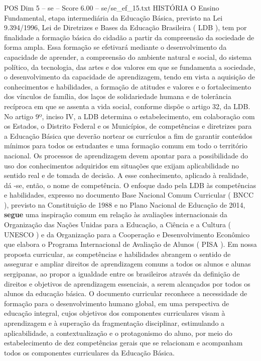 \begin{textsample}{POS Dim 5 – se – Score 6.00 – se/se\_ef\_15.txt}  \label{ex:f5_pos_137}
HISTÓRIA O Ensino Fundamental, etapa intermediária da Educação Básica, previsto na Lei 9.394/1996, Lei de Diretrizes e Bases da Educação Brasileira ( LDB ), tem por finalidade a formação básica do cidadão a partir da compreensão da sociedade de forma ampla.
Essa formação se efetivará mediante o desenvolvimento da capacidade de aprender, a compreensão do ambiente natural e social, do sistema político, da tecnologia, das artes e dos valores em que se fundamenta a sociedade, o desenvolvimento da capacidade de aprendizagem, tendo em vista a aquisição de conhecimentos e habilidades, a formação de atitudes e valores e o fortalecimento dos vínculos de família, dos laços de solidariedade humana e de tolerância recíproca em que se assenta a vida social, conforme dispõe o artigo 32, da LDB.
No artigo 9º, inciso IV, a LDB determina o estabelecimento, em colaboração com os Estados, o Distrito Federal e os Municípios, de competências e diretrizes para a Educação Básica que deverão nortear os currículos a fim de garantir conteúdos mínimos para todos os estudantes e uma formação comum em todo o território nacional.
Os processos de aprendizagem devem apontar para a possibilidade do uso dos conhecimentos adquiridos em situações que exijam aplicabilidade no sentido real e de tomada de decisão.
A esse conhecimento, aplicado à realidade, dá -se, então, o nome de competência.
O enfoque dado pela LDB às competências e habilidades, expresso no documento Base Nacional Comum Curricular ( BNCC ), previsto na Constituição de 1988 e no Plano Nacional de Educação de 2014, \textbf{segue} uma inspiração comum em relação às avaliações internacionais da Organização das Nações Unidas para a Educação, a Ciência e a Cultura ( UNESCO ) e da Organização para a Cooperação e Desenvolvimento Econômico que elabora o Programa Internacional de Avaliação de Alunos ( PISA ).
Em nossa proposta curricular, as competências e habilidades abrangem o sentido de assegurar e ampliar direitos de aprendizagem comuns a todos os alunos e alunas sergipanas, ao propor a igualdade entre os brasileiros através da definição de direitos e objetivos de aprendizagem essenciais, a serem alcançados por todos os alunos da educação básica.
O documento curricular reconhece a necessidade de formação para o desenvolvimento humano global, em uma perspectiva de educação integral, cujos objetivos dos componentes curriculares visam à aprendizagem e à superação da fragmentação disciplinar, estimulando a aplicabilidade, a contextualização e o protagonismo do aluno, por meio do estabelecimento de dez competências gerais que se relacionam e acompanham todos os componentes curriculares da Educação Básica.

\end{textsample}
